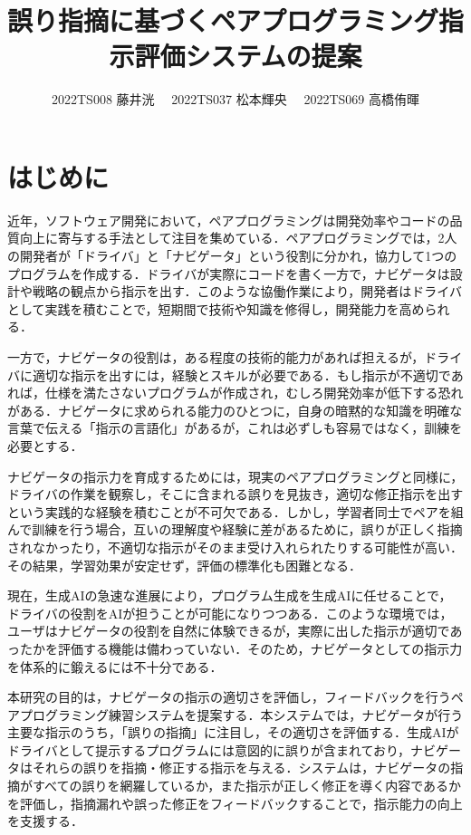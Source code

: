 \documentclass[twoside,twocolumn,10pt]{jsarticle}
\title{誤り指摘に基づくペアプログラミング指示評価システムの提案}
\author{2022TS008 藤井洸 \ \ 2022TS037 松本輝央 \ \ 2022TS069 高橋侑暉}
\begin{document}
\maketitle

\section{はじめに}\label{sec:はじめに}
近年，ソフトウェア開発において，ペアプログラミングは開発効率やコードの品質向上に寄与する手法として注目を集めている\cite{begel2008pair}．ペアプログラミングでは，2人の開発者が「ドライバ」と「ナビゲータ」という役割に分かれ，協力して1つのプログラムを作成する．ドライバが実際にコードを書く一方で，ナビゲータは設計や戦略の観点から指示を出す．このような協働作業により，開発者はドライバとして実践を積むことで，短期間で技術や知識を修得し，開発能力を高められる．

一方で，ナビゲータの役割は，ある程度の技術的能力があれば担えるが，ドライバに適切な指示を出すには，経験とスキルが必要である．もし指示が不適切であれば，仕様を満たさないプログラムが作成され，むしろ開発効率が低下する恐れがある．ナビゲータに求められる能力のひとつに，自身の暗黙的な知識を明確な言葉で伝える「指示の言語化」があるが，これは必ずしも容易ではなく，訓練を必要とする．

ナビゲータの指示力を育成するためには，現実のペアプログラミングと同様に，ドライバの作業を観察し，そこに含まれる誤りを見抜き，適切な修正指示を出すという実践的な経験を積むことが不可欠である．しかし，学習者同士でペアを組んで訓練を行う場合，互いの理解度や経験に差があるために，誤りが正しく指摘されなかったり，不適切な指示がそのまま受け入れられたりする可能性が高い．その結果，学習効果が安定せず，評価の標準化も困難となる．

現在，生成AIの急速な進展により，プログラム生成を生成AIに任せることで，ドライバの役割をAIが担うことが可能になりつつある\cite{Surveyre96:online}．このような環境では，ユーザはナビゲータの役割を自然に体験できるが，実際に出した指示が適切であったかを評価する機能は備わっていない．そのため，ナビゲータとしての指示力を体系的に鍛えるには不十分である．

本研究の目的は，ナビゲータの指示の適切さを評価し，フィードバックを行うペアプログラミング練習システムを提案する．本システムでは，ナビゲータが行う主要な指示のうち，「誤りの指摘」に注目し，その適切さを評価する．生成AIがドライバとして提示するプログラムには意図的に誤りが含まれており，ナビゲータはそれらの誤りを指摘・修正する指示を与える．システムは，ナビゲータの指摘がすべての誤りを網羅しているか，また指示が正しく修正を導く内容であるかを評価し，指摘漏れや誤った修正をフィードバックすることで，指示能力の向上を支援する．
\end{document}
